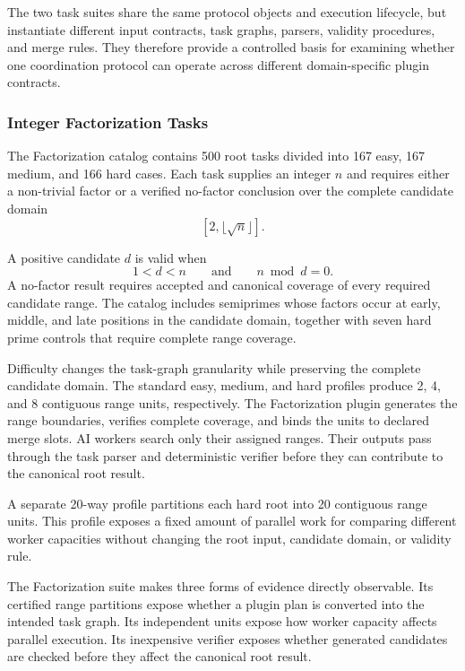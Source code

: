 \documentclass{article}
\theoremstyle{plain}
\begin{document}
The two task suites share the same protocol objects and execution
lifecycle, but instantiate different input contracts, task graphs,
parsers, validity procedures, and merge rules. They therefore provide a
controlled basis for examining whether one coordination protocol can
operate across different domain-specific plugin contracts.


\subsubsection{Integer Factorization Tasks}

The Factorization catalog contains 500 root tasks divided into 167 easy,
167 medium, and 166 hard cases. Each task supplies an integer \(n\) and
requires either a non-trivial factor or a verified no-factor conclusion
over the complete candidate domain
\[
[2,\lfloor\sqrt{n}\rfloor].
\]

A positive candidate \(d\) is valid when
\[
1<d<n
\qquad\text{and}\qquad
n\bmod d=0.
\]
A no-factor result requires accepted and canonical coverage of every
required candidate range. The catalog includes semiprimes whose factors
occur at early, middle, and late positions in the candidate domain,
together with seven hard prime controls that require complete range
coverage.

Difficulty changes the task-graph granularity while preserving the
complete candidate domain. The standard easy, medium, and hard profiles
produce 2, 4, and 8 contiguous range units, respectively. The
Factorization plugin generates the range boundaries, verifies complete
coverage, and binds the units to declared merge slots. AI workers search
only their assigned ranges. Their outputs pass through the task parser
and deterministic verifier before they can contribute to the canonical
root result.

A separate 20-way profile partitions each hard root into 20 contiguous
range units. This profile exposes a fixed amount of parallel work for
comparing different worker capacities without changing the root input,
candidate domain, or validity rule.

The Factorization suite makes three forms of evidence directly observable.
Its certified range partitions expose whether a plugin plan is converted
into the intended task graph. Its independent units expose how worker
capacity affects parallel execution. Its inexpensive verifier exposes
whether generated candidates are checked before they affect the canonical
root result.
\end{document}
